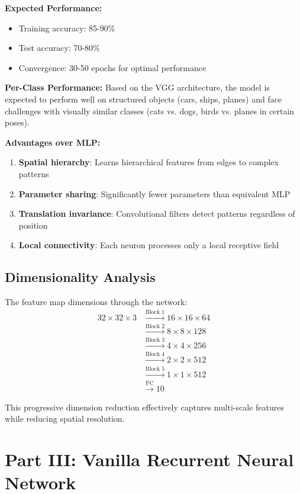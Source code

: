 \documentclass[11pt,a4paper]{article}
\begin{document}
\textbf{Expected Performance:}
\begin{itemize}
    \item Training accuracy: 85-90\%
    \item Test accuracy: 70-80\%
    \item Convergence: 30-50 epochs for optimal performance
\end{itemize}

\textbf{Per-Class Performance:}
Based on the VGG architecture, the model is expected to perform well on structured objects (cars, ships, planes) and face challenges with visually similar classes (cats vs. dogs, birds vs. planes in certain poses).

\textbf{Advantages over MLP:}
\begin{enumerate}
    \item \textbf{Spatial hierarchy}: Learns hierarchical features from edges to complex patterns
    \item \textbf{Parameter sharing}: Significantly fewer parameters than equivalent MLP
    \item \textbf{Translation invariance}: Convolutional filters detect patterns regardless of position
    \item \textbf{Local connectivity}: Each neuron processes only a local receptive field
\end{enumerate}

\subsection{Dimensionality Analysis}

The feature map dimensions through the network:
\begin{align*}
    32 \times 32 \times 3 &\xrightarrow{\text{Block 1}} 16 \times 16 \times 64 \\
    &\xrightarrow{\text{Block 2}} 8 \times 8 \times 128 \\
    &\xrightarrow{\text{Block 3}} 4 \times 4 \times 256 \\
    &\xrightarrow{\text{Block 4}} 2 \times 2 \times 512 \\
    &\xrightarrow{\text{Block 5}} 1 \times 1 \times 512 \\
    &\xrightarrow{\text{FC}} 10
\end{align*}

This progressive dimension reduction effectively captures multi-scale features while reducing spatial resolution.

\section{Part III: Vanilla Recurrent Neural Network}
\end{document}
